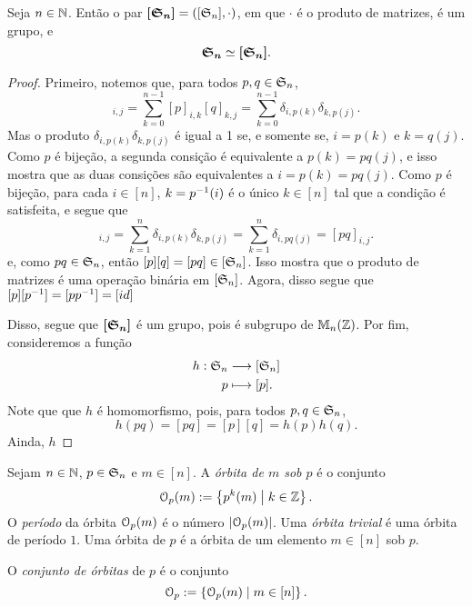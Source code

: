 \begin{prop}
	Seja $n \in \mathbb{N}$. Então o par $\bm{[\mathfrak{S}_n]}=([\mathfrak{S}_n],\cdot)$, em que $\cdot$ é o produto de matrizes, é um grupo, e
	\begin{equation*}
	\bm{\mathfrak{S}_n} \simeq \bm{[\mathfrak{S}_n]}.
	\end{equation*}
\end{prop}
\begin{proof}
	Primeiro, notemos que, para todos $p,q \in \mathfrak{S}_n$,
	\begin{equation*}
	[p][q]_{i,j} = \sum_{k=0}^{n-1} [p]_{i,k}[q]_{k,j} = \sum_{k=0}^{n-1} \delta_{i,p(k)}\delta_{k,p(j)}.
	\end{equation*}
	Mas o produto $\delta_{i,p(k)}\delta_{k,p(j)}$ é igual a 1 se, e somente se, $i=p(k)$ e $k=q(j)$. Como $p$ é bijeção, a segunda consição é equivalente a $p(k)=pq(j)$, e isso mostra que as duas consições são equivalentes a $i=p(k)=pq(j)$. Como $p$ é bijeção, para cada $i \in [n]$, $k=p^{-1}(i)$ é o único $k \in [n]$ tal que a condição é satisfeita, e segue que
	\begin{equation*}
	[p][q]_{i,j} = \sum_{k=1}^n \delta_{i,p(k)}\delta_{k,p(j)} = \sum_{k=1}^n \delta_{i,pq(j)} = [pq]_{i,j}.
	\end{equation*}
e, como $pq \in \mathfrak{S}_n$, então $[p][q]=[pq] \in [\mathfrak{S}_n]$. Isso mostra que o produto de matrizes é uma operação binária em $[\mathfrak{S}_n]$. Agora, disso segue que $[p][p^{-1}]=[pp^{-1}]=[id]$





Disso, segue que $\bm{[\mathfrak{S}_n]}$ é um grupo, pois é subgrupo de $\mathbb{M}_n(\mathbb{Z})$. Por fim, consideremos a função
	\begin{align*}
	{h}: {\mathfrak{S}_n} &\longrightarrow {[\mathfrak{S}_n]} \\{p} &\longmapsto {[p]}.
	\end{align*}
Note que que $h$ é homomorfismo, pois, para todos $p,q \in \mathfrak{S}_n$,
	\begin{equation*}
	h(pq) = [pq]= [p][q] = h(p)h(q).
	\end{equation*}
Ainda, $h$
\end{proof}

\begin{defi}
	Sejam $n \in \mathbb{N}$, $p \in \mathfrak{S}_n$ e $m \in [n]$. A \emph{órbita de $m$ sob $p$} é o conjunto
	\begin{equation*}
	\mathcal{O}_p(m) := \left\{p^k(m) \;\middle\vert\; k \in \mathbb{Z} \right\}.
	\end{equation*}
O \emph{período} da órbita $\mathcal{O}_p(m)$ é o número $\left\vert{\mathcal{O}_p(m)}\right\vert$. Uma \emph{órbita trivial} é uma órbita de período $1$. Uma órbita de $p$ é a órbita de um elemento $m \in [n]$ sob $p$.

	O \emph{conjunto de órbitas} de $p$ é o conjunto
	\begin{equation*}
	\mathcal{O}_p := \left\{\mathcal{O}_p(m) \;\middle\vert\; m \in [n] \right\}.
	\end{equation*}
\end{defi}

